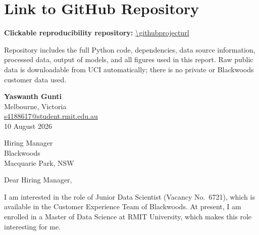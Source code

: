 {}
\label{sec:Job Listing}



\section{Link to GitHub Repository}
\label{sec:GitHub}

\noindent\textbf{Clickable reproducibility repository:}
\url{\githubprojecturl}

Repository includes the full Python code, dependencies, data source information, processed data, output of models, and all figures used in this report. Raw public data is downloadable from UCI automatically; there is no private or Blackwoods customer data used.


\clearpage
{}
{}
\label{sec:Cover Letter}
\thispagestyle{empty}

\begin{flushright}
\textbf{Yaswanth Gunti}\\
Melbourne, Victoria\\
\href{mailto:s4188617@student.rmit.edu.au}{s4188617@student.rmit.edu.au}\\[0.8em]
10 August 2026
\end{flushright}

\noindent Hiring Manager\\
Blackwoods\\
Macquarie Park, NSW

\medskip
\noindent Dear Hiring Manager,

\medskip
\noindent I am interested in the role of Junior Data Scientist (Vacancy No.~6721), which is available in the Customer Experience Team of Blackwoods. At present, I am enrolled in a Master of Data Science at RMIT University, which makes this role interesting for me.

